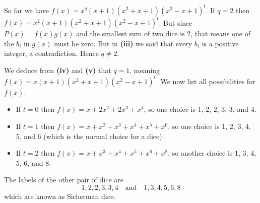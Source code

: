 \begin{questions}
\begin{partquestions}{\roman*}
        \item So far we have $f(x) = x^q(x+1)(x^2+x+1)(x^2-x+1)^t$. If $q = 2$ then $f(x) = x^2(x+1)(x^2+x+1)(x^2-x+1)^t$. But since $P(x) = f(x)g(x)$ and the smallest sum of two dice is 2, that means one of the $b_i$ in $g(x)$ must be zero. But in \textbf{(iii)} we said that every $b_i$ is a positive integer, a contradiction. Hence $q \neq 2$.

        \item We deduce from \textbf{(iv)} and \textbf{(v)} that $q = 1$, meaning $f(x) = x(x+1)(x^2+x+1)(x^2-x+1)^t$. We now list all possibilities for $f(x)$.
        \begin{itemize}
            \item If $t = 0$ then $f(x) = x + 2x^2 + 2x^3 + x^4$, so one choice is 1, 2, 2, 3, 3, and 4.
            \item If $t = 1$ then $f(x) = x + x^2 + x^3 + x^4 + x^5 + x^6$, so one choice is 1, 2, 3, 4, 5, and 6 (which is the normal choice for a dice).
            \item If $t = 2$ then $f(x) = x + x^3 + x^4 + x^5 + x^6 + x^8$, so another choice is 1, 3, 4, 5, 6, and 8.
        \end{itemize}

        \item The labels of the other pair of dice are
        \[
            1,2,2,3,3,4 \quad\text{and}\quad 1,3,4,5,6,8
        \]
        which are known as Sicherman dice.
    \end{partquestions}
\end{questions}
